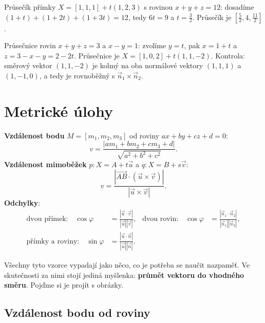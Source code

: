 \begin{example}
  Průsečík přímky $X = [1, 1, 1] + t(1, 2, 3)$ s rovinou $x + y + z = 12$: dosadíme $(1 + t) + (1 + 2t) + (1 + 3t) = 12$, tedy $6t = 9$ a $t = \frac{3}{2}$. Průsečík je $\left[\frac{5}{2}, 4, \frac{11}{2}\right]$.
\end{example}

\begin{example}
  Průsečnice rovin $x + y + z = 3$ a $x - y = 1$: zvolíme $y = t$, pak $x = 1 + t$ a $z = 3 - x - y = 2 - 2t$. Průsečnice je $X = [1, 0, 2] + t(1, 1, -2)$. Kontrola: směrový vektor $(1, 1, -2)$ je kolmý na oba normálové vektory $(1, 1, 1)$ a $(1, -1, 0)$, a tedy je rovnoběžný s $\vec{n}_1\times\vec{n}_2$.
\end{example}

\section{Metrické úlohy}\label{sec:metricke-ulohy-prostor}

\begin{definitionbox}
  \textbf{Vzdálenost bodu} $M = [m_1, m_2, m_3]$ od roviny $ax + by + cz + d = 0$:
  \begin{equation*}
    v = \frac{|am_1 + bm_2 + cm_3 + d|}{\sqrt{a^2 + b^2 + c^2}}.
  \end{equation*}
  \textbf{Vzdálenost mimoběžek} $p: X = A + t\vec{u}$ a $q: X = B + s\vec{v}$:
  \begin{equation*}
    v = \frac{|\overrightarrow{AB}\cdot(\vec{u}\times\vec{v})|}{|\vec{u}\times\vec{v}|}.
  \end{equation*}
  \textbf{Odchylky}:
  \begin{align*}
    \text{dvou přímek:}\quad\cos\varphi &= \frac{|\vec{u}\cdot\vec{v}|}{|\vec{u}||\vec{v}|}, &
    \text{dvou rovin:}\quad\cos\varphi &= \frac{|\vec{n}_1\cdot\vec{n}_2|}{|\vec{n}_1||\vec{n}_2|},\\
    \text{přímky a roviny:}\quad\sin\varphi &= \frac{|\vec{u}\cdot\vec{n}|}{|\vec{u}||\vec{n}|}.
  \end{align*}
\end{definitionbox}

Všechny tyto vzorce vypadají jako něco, co je potřeba se naučit nazpaměť. Ve skutečnosti za nimi stojí jediná myšlenka: \textbf{průmět vektoru do vhodného směru}. Pojďme si je projít s obrázky.

\subsection*{Vzdálenost bodu od roviny}\label{sec:vzdalenost-bod-rovina}

